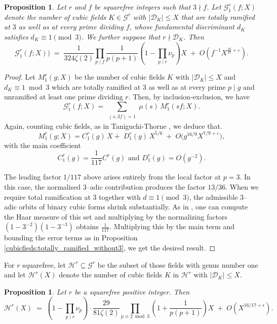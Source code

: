 \documentclass[11pt,reqno]{amsart}
\newcommand{\cD}{\mathcal{D}}
\newcommand{\cG}{\mathcal{G}}
\newcommand{\cH}{\mathcal{H}}
\newtheorem{proposition}[theorem]{Proposition}
\theoremstyle{definition}
\theoremstyle{remark}
\begin{document}
\begin{proposition}\label{cubicfieds:totally_ramified_with3}
Let $r$ and $f$ be squarefree integers such that $3\nmid f$.
Let $\cG_1^{r}(f; X)$ denote the number of cubic fields $K \in \cG^r$ with $|\cD_K| \leq X$ that are totally ramified at $3$ as well as at every prime dividing $f$, whose fundamental discriminant $d_K$ satisfies $d_K \equiv 1 \pmod{3}$. We further suppose that $r \nmid \cD_K$. Then
\[
\cG_1^r(f; X)) \;=\; \frac{1}{324 \zeta(2)} 
\prod_{p \mid f} \frac{1}{p(p+1)} 
\!\left(1 - \prod_{p \mid r} \nu_p \right) X 
\;+\; O\!\left(f^{-1} X^{\tfrac{16}{17} + \varepsilon}\right).
\]

\end{proposition}

\begin{proof}
    	Let $M_1^r(g;X)$ be the number of cubic fields $K$ with $|\cD_K|\le X$ and $d_K\equiv 1 \bmod 3$ which are totally ramified at $3$ as well as at every prime $p\mid g$  and unramified at least one prime dividing $r$. Then, by inclusion-exclusion, we have
	\begin{equation*}	\cG_1^r(f;X)=\sum_{\substack{(s,3f)=1}}\mu(s)\,M_1^r(sf;X).
	\end{equation*}
Again, counting cubic fields, as in Taniguchi-Thorne  \cite{countingcubicfields}, we deduce that.
	\begin{equation*}
	M^r_1(g;X)=C_1^r(g)\,X+\; D_1^r(g)\,X^{5/6} 
	\;+\; O\!\big(g^{16/9} X^{7/9+\varepsilon}\big),
	\end{equation*}
	with the main coefficient
	\begin{equation*}
	C_1^r(g)=\frac{1}{117}C^r(g)\,\,\text{and}\,\,  D_1^r(g)=O(g^{-2}).
	\end{equation*}
 
The leading factor $1/117$ above arises entirely from the local factor at $p=3$. 
In this case, the normalised $3$--adic contribution produces the factor 
$13/36$. When we require total ramification at $3$ together with 
$d\equiv1\pmod{3}$, the admissible $3$--adic orbits of binary cubic forms shrink substantially.  As in \cite[Proposition~3.2]{cubicwithgenusnumber1}, one can compute the Haar measure of this set and multiplying by the normalizing 
factors $(1-3^{-2})(1-3^{-3})$ obtains $\frac{1}{117}$. Multiplying this by the main term and bounding the error terms as in Proposition \ref{cubicfieds:totally_ramified_without3}, we get the desired result.    
\end{proof}

For $r$ squarefree, let $\cH^r \subseteq \cG^r$ be the subset of those fields with genus number one and let $\cH^r(X)$ denote the number of cubic fields $K$ in $\cH^r$ with $|\cD_K| \leq X$.
\begin{proposition}\label{cubic:genusone:local}
    Let $r$ be a squarefree positive integer.  Then
\[
\cH^r(X) \;=\; \left(1 - \prod_{p \mid r} \nu_p \right) \cdot \frac{29}{81 \zeta(2)} 
\prod_{p \equiv 2 \bmod{3}} \left( 1 + \frac{1}{p(p+1)} \right) X \;+\; O\!\left(X^{16/17+\epsilon}\right).
\]
\end{proposition}
\end{document}
